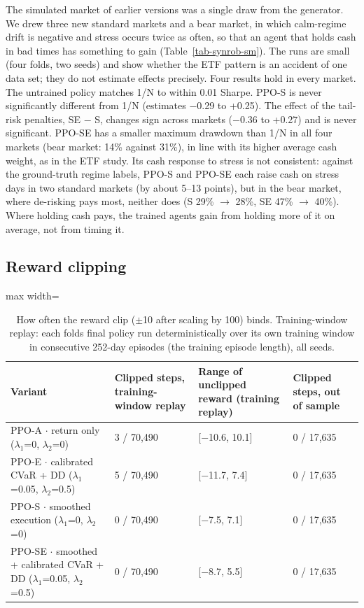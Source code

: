 \documentclass[11pt]{article}
\begin{document}
The simulated market of earlier versions was a single draw from the generator. We drew three new standard markets and a bear market, in which calm-regime drift is negative and stress occurs twice as often, so that an agent that holds cash in bad times has something to gain (Table~\ref{tab-synrob-sm}). The runs are small (four folds, two seeds) and show whether the ETF pattern is an accident of one data set; they do not estimate effects precisely. Four results hold in every market. The untrained policy matches 1/N to within 0.01 Sharpe. PPO-S is never significantly different from 1/N (estimates $-$0.29 to +0.25). The effect of the tail-risk penalties, SE $-$ S, changes sign across markets ($-$0.36 to +0.27) and is never significant. PPO-SE has a smaller maximum drawdown than 1/N in all four markets (bear market: 14\% against 31\%), in line with its higher average cash weight, as in the ETF study. Its cash response to stress is not consistent: against the ground-truth regime labels, PPO-S and PPO-SE each raise cash on stress days in two standard markets (by about 5--13 points), but in the bear market, where de-risking pays most, neither does (S 29\% $\to$ 28\%, SE 47\% $\to$ 40\%). Where holding cash pays, the trained agents gain from holding more of it on average, not from timing it.

\subsection{Reward clipping}\label{reward-clipping}

\begin{table}[!htbp]
\centering\scriptsize
\caption{How often the reward clip ($\pm$10 after scaling by 100) binds. Training-window replay: each fold\textquotesingle s final policy run deterministically over its own training window in consecutive 252-day episodes (the training episode length), all seeds.\label{tab-clip-no}}
\begin{adjustbox}{max width=\linewidth}
\begin{tabular}{@{}llll@{}}
\toprule
Variant & Clipped steps, training-window replay & Range of unclipped reward (training replay) & Clipped steps, out of sample \\
\midrule
PPO-A $\cdot$ return only {($\lambda_1$=0, $\lambda_2$=0)} & 3 / 70,490 & {[}$-$10.6, 10.1{]} & 0 / 17,635 \\
PPO-E $\cdot$ calibrated CVaR + DD {($\lambda_1$=0.05, $\lambda_2$=0.5)} & 5 / 70,490 & {[}$-$11.7, 7.4{]} & 0 / 17,635 \\
PPO-S $\cdot$ smoothed execution {($\lambda_1$=0, $\lambda_2$=0)} & 0 / 70,490 & {[}$-$7.5, 7.1{]} & 0 / 17,635 \\
PPO-SE $\cdot$ smoothed + calibrated CVaR + DD {($\lambda_1$=0.05, $\lambda_2$=0.5)} & 0 / 70,490 & {[}$-$8.7, 5.5{]} & 0 / 17,635 \\
\bottomrule
\end{tabular}
\end{adjustbox}
\end{table}
\end{document}

